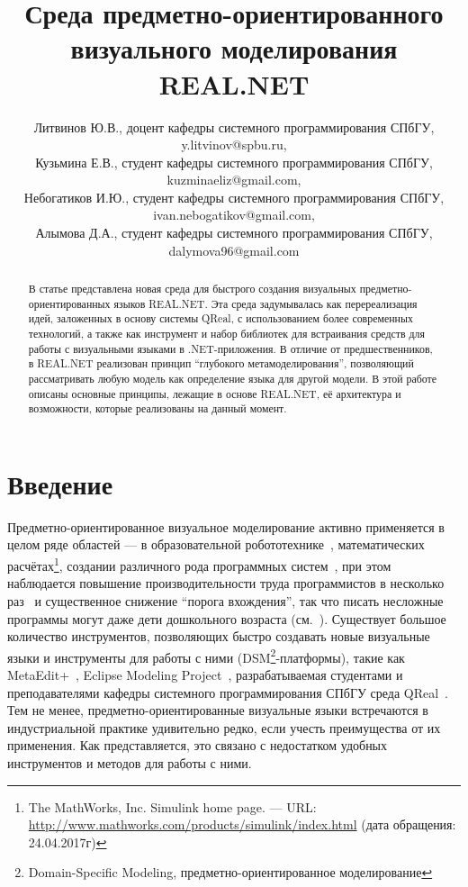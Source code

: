 \documentclass{spisok-article}
\title{Среда предметно-ориентированного визуального моделирования REAL.NET}
\author{
	Литвинов Ю.В., доцент кафедры системного программирования СПбГУ,
	y.litvinov@spbu.ru,

	Кузьмина Е.В., студент кафедры системного программирования СПбГУ,
	kuzminaeliz@gmail.com,

	Небогатиков И.Ю., студент кафедры системного программирования СПбГУ,
	ivan.nebogatikov@gmail.com,

	Алымова Д.А., студент кафедры системного программирования СПбГУ, 
	dalymova96@gmail.com
}
\begin{document}
\maketitle

\begin{abstract}
В статье представлена новая среда для быстрого создания визуальных предметно-ориентированных языков REAL.NET. Эта среда задумывалась как перереализация идей, заложенных в основу системы QReal, с использованием более современных технологий, а также как инструмент и набор библиотек для встраивания средств для работы с визуальными языками в .NET-приложения. В отличие от предшественников, в REAL.NET реализован принцип ``глубокого метамоделирования'', позволяющий рассматривать любую модель как определение языка для другой модели. В этой работе описаны основные принципы, лежащие в основе REAL.NET, её архитектура и возможности, которые реализованы на данный момент.
\end{abstract}

\section{Введение}

Предметно-ориентированное визуальное моделирование активно применяется в целом ряде областей --- в образовательной робототехнике~\cite{portsmore1999robolab}, математических расчётах\footnote{The MathWorks, Inc. Simulink home page. –– URL: \url{http://www.mathworks.com/products/simulink/index.html} (дата обращения: 24.04.2017г)}, создании различного рода программных систем~\cite{luoma2004defining}, при этом наблюдается повышение производительности труда программистов в несколько раз~\cite{kelly2000visual} и существенное снижение ``порога вхождения'', так что писать несложные программы могут даже дети дошкольного возраста (см.~\cite{portsmore1999robolab}). Существует большое количество инструментов, позволяющих быстро создавать новые визуальные языки и инструменты для работы с ними (DSM\footnote{Domain-Specific Modeling, предметно-ориентированное моделирование}-платформы), такие как MetaEdit+~\cite{kelly2008domain}, Eclipse Modeling Project~\cite{gronback2009eclipse}, разрабатываемая студентами и преподавателями кафедры системного программирования СПбГУ среда QReal~\cite{terekhov2013qreal,kuzenkova2013qreal,kuzenkova2011qreal}. Тем не менее, предметно-ориентированные визуальные языки встречаются в индустриальной практике удивительно редко, если учесть преимущества от их применения. Как представляется, это связано с недостатком удобных инструментов и методов для работы с ними.
\end{document}
